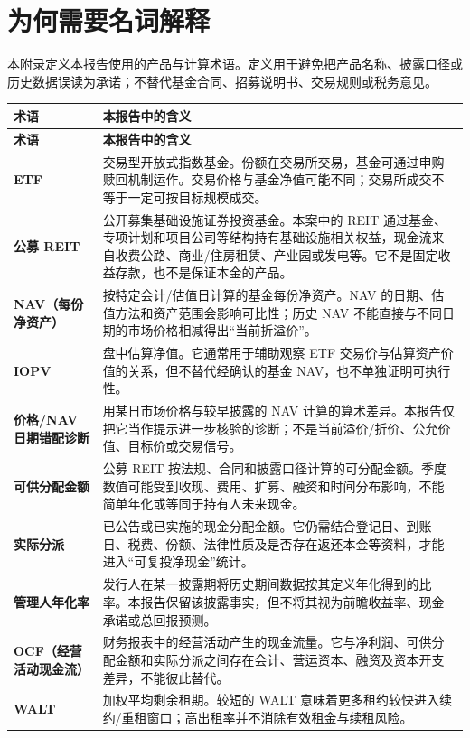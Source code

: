 \section{为何需要名词解释}

本附录定义本报告使用的产品与计算术语。定义用于避免把产品名称、披露口径或历史数据误读为承诺；不替代基金合同、招募说明书、交易规则或税务意见。

\begin{longtable}{L{3.0cm}L{11.5cm}}
\toprule
\textbf{术语} & \textbf{本报告中的含义} \\
\midrule
\endfirsthead
\toprule
\textbf{术语} & \textbf{本报告中的含义} \\
\midrule
\endhead
\textbf{ETF} & 交易型开放式指数基金。份额在交易所交易，基金可通过申购赎回机制运作。交易价格与基金净值可能不同；交易所成交不等于一定可按目标规模成交。\\
\textbf{公募 REIT} & 公开募集基础设施证券投资基金。本案中的 REIT 通过基金、专项计划和项目公司等结构持有基础设施相关权益，现金流来自收费公路、商业/住房租赁、产业园或发电等。它不是固定收益存款，也不是保证本金的产品。\\
\textbf{NAV（每份净资产）} & 按特定会计/估值日计算的基金每份净资产。NAV 的日期、估值方法和资产范围会影响可比性；历史 NAV 不能直接与不同日期的市场价格相减得出“当前折溢价”。\\
\textbf{IOPV} & 盘中估算净值。它通常用于辅助观察 ETF 交易价与估算资产价值的关系，但不替代经确认的基金 NAV，也不单独证明可执行性。\\
\textbf{价格/NAV 日期错配诊断} & 用某日市场价格与较早披露的 NAV 计算的算术差异。本报告仅把它当作提示进一步核验的诊断；不是当前溢价/折价、公允价值、目标价或交易信号。\\
\textbf{可供分配金额} & 公募 REIT 按法规、合同和披露口径计算的可分配金额。季度数值可能受到收现、费用、扩募、融资和时间分布影响，不能简单年化或等同于持有人未来现金。\\
\textbf{实际分派} & 已公告或已实施的现金分配金额。它仍需结合登记日、到账日、税费、份额、法律性质及是否存在返还本金等资料，才能进入“可复投净现金”统计。\\
\textbf{管理人年化率} & 发行人在某一披露期将历史期间数据按其定义年化得到的比率。本报告保留该披露事实，但不将其视为前瞻收益率、现金承诺或总回报预测。\\
\textbf{OCF（经营活动现金流）} & 财务报表中的经营活动产生的现金流量。它与净利润、可供分配金额和实际分派之间存在会计、营运资本、融资及资本开支差异，不能彼此替代。\\
\textbf{WALT} & 加权平均剩余租期。较短的 WALT 意味着更多租约较快进入续约/重租窗口；高出租率并不消除有效租金与续租风险。\\

\end{longtable}
